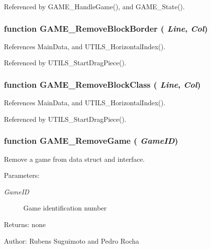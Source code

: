Referenced by GAME\_\-HandleGame(), and GAME\_\-State().
\subsubsection[GAME\_\-RemoveBlockBorder]{\setlength{\rightskip}{0pt plus 5cm}function GAME\_\-RemoveBlockBorder ( {\em Line}, \/   {\em Col})}\label{game_2game_8js_520d50c8dafabdfe0e407be0f68462e9}




References MainData, and UTILS\_\-HorizontalIndex().

Referenced by UTILS\_\-StartDragPiece().
\subsubsection[GAME\_\-RemoveBlockClass]{\setlength{\rightskip}{0pt plus 5cm}function GAME\_\-RemoveBlockClass ( {\em Line}, \/   {\em Col})}\label{game_2game_8js_b3a171a9d8af4728a48f6b2082e82b5b}




References MainData, and UTILS\_\-HorizontalIndex().

Referenced by UTILS\_\-StartDragPiece().
\subsubsection[GAME\_\-RemoveGame]{\setlength{\rightskip}{0pt plus 5cm}function GAME\_\-RemoveGame ( {\em GameID})}\label{game_2game_8js_abf7ae56d940ce6fef08a06c7a6b0c3d}


Remove a game from data struct and interface. 

\begin{Desc}
\item[Parameters:]
\begin{description}
\item[{\em GameID}]Game identification number \end{description}
\end{Desc}
\begin{Desc}
\item[Returns:]none \end{Desc}
\begin{Desc}
\item[Author:]Rubens Suguimoto and Pedro Rocha \end{Desc}


